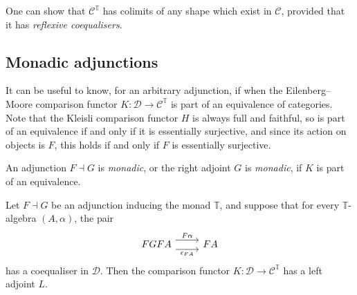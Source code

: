 \begin{remark}
    One can show that \( \mathcal C^{\mathbb T} \) has colimits of any shape which exist in \( \mathcal C \), provided that it has \emph{reflexive coequalisers}.
\end{remark}

\subsection{Monadic adjunctions}
It can be useful to know, for an arbitrary adjunction, if when the Eilenberg--Moore comparison functor \( K : \mathcal D \to \mathcal C^{\mathbb T} \) is part of an equivalence of categories.
Note that the Kleisli comparison functor \( H \) is always full and faithful, so is part of an equivalence if and only if it is essentially surjective, and since its action on objects is \( F \), this holds if and only if \( F \) is essentially surjective.
\begin{definition}
    An adjunction \( F \dashv G \) is \emph{monadic}, or the right adjoint \( G \) is \emph{monadic}, if \( K \) is part of an equivalence.
\end{definition}
\begin{lemma}
    Let \( F \dashv G \) be an adjunction inducing the monad \( \mathbb T \), and suppose that for every \( \mathbb T \)-algebra \( (A, \alpha) \), the pair
\[\begin{tikzcd}
	FGFA & FA
	\arrow["F\alpha", shift left=2, from=1-1, to=1-2]
	\arrow["{\epsilon_{FA}}"', shift right=2, from=1-1, to=1-2]
\end{tikzcd}\]
    has a coequaliser in \( \mathcal D \).
    Then the comparison functor \( K : \mathcal D \to \mathcal C^{\mathbb T} \) has a left adjoint \( L \).
\end{lemma}
